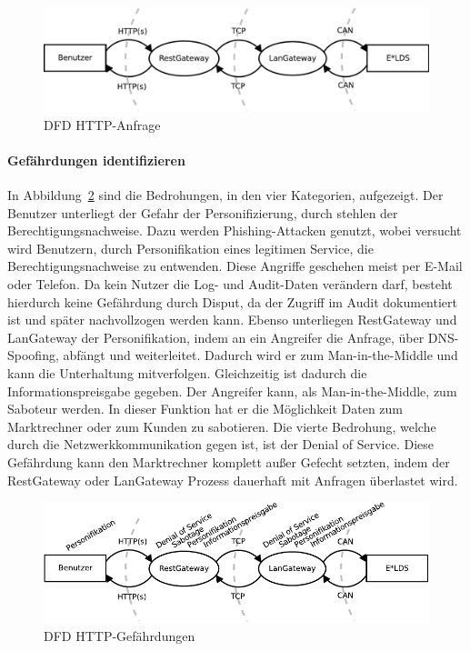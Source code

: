 \documentclass[11pt,a4paper]{report}
\begin{document}
\begin{figure}[htbp]
\centering
\includegraphics[scale=0.6]{images/dfd_http.pdf}
\caption{DFD HTTP-Anfrage}
\label{fig:dfd_http}
\end{figure}

\paragraph{Gefährdungen identifizieren}

In Abbildung~\ref{fig:dfd_http_threat} sind die Bedrohungen, in den vier Kategorien, aufgezeigt. Der Benutzer unterliegt der Gefahr der Personifizierung, durch stehlen der Berechtigungsnachweise. Dazu werden Phishing-Attacken genutzt, wobei versucht wird Benutzern, durch Personifikation eines legitimen Service, die Berechtigungsnachweise zu entwenden. Diese Angriffe geschehen meist per E-Mail oder Telefon. Da kein Nutzer die Log- und Audit-Daten verändern darf, besteht hierdurch keine Gefährdung durch Disput, da der Zugriff im Audit dokumentiert ist und später nachvollzogen werden kann. Ebenso unterliegen RestGateway und LanGateway der Personifikation, indem an ein Angreifer die Anfrage, über DNS-Spoofing, abfängt und weiterleitet. Dadurch wird er zum Man-in-the-Middle und kann die Unterhaltung mitverfolgen. Gleichzeitig ist dadurch die Informationspreisgabe gegeben. Der Angreifer kann, als Man-in-the-Middle, zum Saboteur werden. In dieser Funktion hat er die Möglichkeit Daten zum Marktrechner oder zum Kunden zu sabotieren. Die vierte Bedrohung, welche durch die Netzwerkkommunikation gegen ist, ist der Denial of Service. Diese Gefährdung kann den Marktrechner komplett außer Gefecht setzten, indem der RestGateway oder LanGateway Prozess dauerhaft mit Anfragen überlastet wird.

\begin{figure}[htbp]
\centering
\includegraphics[scale=1]{images/dfd_http_threat.pdf}
\caption{DFD HTTP-Gefährdungen}
\label{fig:dfd_http_threat}
\end{figure}
\end{document}
